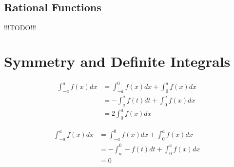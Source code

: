 \documentclass[english,course]{Notes}
\begin{document}
\subsection{Rational Functions} !!!TODO!!!

\section{Symmetry and Definite Integrals} 


$$\begin{aligned} \int_{-a}^{a} f(x) d x &=\int_{-a}^{0} f(x) d x+\int_{0}^{a} f(x) d x \\ &=-\int_{a}^{a} f(t) d t+\int_{0}^{a} f(x) d x \\ &=2 \int_{0}^{a} f(x) d x \end{aligned}$$


$$\begin{aligned} \int_{-a}^{a} f(x) d x &=\int_{-a}^{0} f(x) d x+\int_{0}^{a} f(x) d x \\ &=-\int_{a}^{0}-f(t) d t+\int_{0}^{a} f(x) d x \\ &=0 \end{aligned}$$


\newpage
\nocite{*}
\printbibliography
\end{document}

